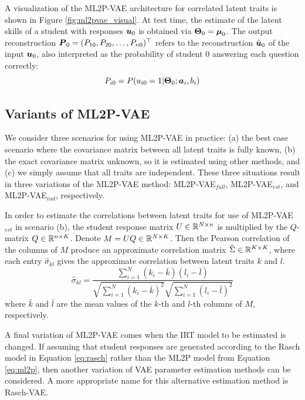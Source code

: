 A visualization of the ML2P-VAE architecture for correlated latent traits is shown in Figure \ref{fig:ml2pvae_visual}. At test time, the estimate of the latent skills of a student with responses $\boldsymbol{u}_0$ is obtained via $\boldsymbol{\Theta}_0 = \boldsymbol{\mu}_0$. The output reconstruction $\boldsymbol{P}_0 = (P_{10}, P_{20},\ldots, P_{n0})^\top$ refers to the reconstruction $\hat{\boldsymbol{u}}_0$ of the input $\boldsymbol{u}_0$, also interpreted as the probability of student $0$ answering each question correctly:
\[P_{i0} = P(u_{i0} = 1 | \boldsymbol{\Theta}_0; \boldsymbol{a}_i, b_i)\]



\subsection{Variants of ML2P-VAE}\label{sec:variants}

We consider three scenarios for using ML2P-VAE in practice: (a) the best case scenario where the covariance matrix between all latent traits is fully known, (b) the exact covariance matrix unknown, so it is estimated using other methods, and (c) we simply assume that all traits are independent. These three situations result in three variations of the ML2P-VAE method: ML2P-VAE$_{full}$, ML2P-VAE$_{est}$, and ML2P-VAE$_{ind}$, respectively. 

In order to estimate the correlations between latent traits for use of ML2P-VAE$_{est}$ in scenario (b), the student response matrix $U \in \mathbb{R}^{N\times n}$ is multiplied by the $Q$-matrix $Q \in \mathbb{R}^{n \times K}$. Denote $M = UQ \in \mathbb{R}^{N\times K}$. Then the Pearson correlation of the columns of $M$ produce an approximate correlation matrix $\hat \Sigma \in \mathbb{R}^{K \times K}$, where each entry $\hat \sigma_{kl}$ gives the approximate correlation between latent traits $k$ and $l$.
\begin{equation}
  \hat \sigma_{kl} = \frac{\sum_{i=1}^N (k_i - \bar k)(l_i - \bar l)}{\sqrt{\sum_{i=1}^N(k_i - \bar k)^2} \sqrt{\sum_{i=1}^N (l_i - \bar l)^2}}
  \label{eq:approx_cor_mat}
\end{equation}
where $\bar k$ and $\bar l$ are the mean values of the $k$-th and $l$-th columns of $M$, respectively.

A final variation of ML2P-VAE comes when the IRT model to be estimated is changed. If assuming that student responses are generated according to the Rasch model in Equation \ref{eq:rasch} rather than the ML2P model from Equation \ref{eq:ml2p}, then another variation of VAE parameter estimation methods can be considered. A more appropriate name for this alternative estimation method is Rasch-VAE.

